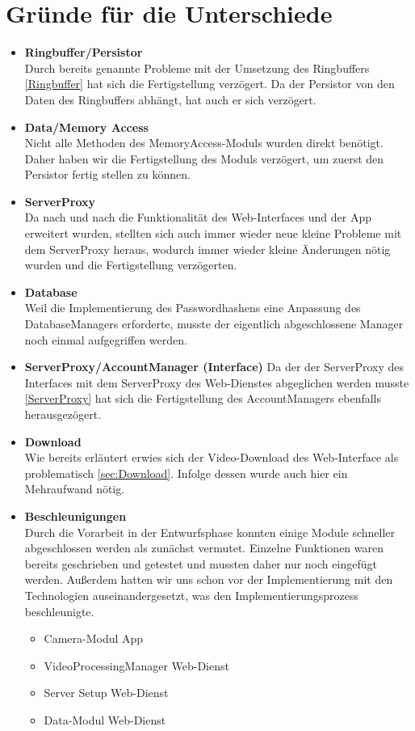 \section{Gründe für die Unterschiede} \label{sec:PlanDiff}
\begin{itemize}

\item \textbf{Ringbuffer/Persistor} \hfill \\
Durch bereits genannte Probleme mit der Umsetzung des Ringbuffers \eqref{Ringbuffer} hat sich die Fertigstellung verzögert. Da der Persistor von den Daten des Ringbuffers abhängt, hat auch er sich verzögert.

\item \textbf{Data/Memory Access} \hfill \\
Nicht alle Methoden des MemoryAccess-Moduls wurden direkt benötigt. Daher haben wir die Fertigstellung des Moduls verzögert, um zuerst den Persistor fertig stellen zu können.

\item \label{ServerProxy} \textbf{ServerProxy} \hfill \\
Da nach und nach die Funktionalität des Web-Interfaces und der App erweitert wurden, stellten sich auch immer wieder neue kleine Probleme mit dem ServerProxy heraus, wodurch immer wieder kleine Änderungen nötig wurden und die Fertigstellung verzögerten.

\item \textbf{Database} \hfill \\
Weil die Implementierung des Passwordhashens eine Anpassung des DatabaseManagers erforderte, musste der eigentlich abgeschlossene Manager noch einmal aufgegriffen werden.

\item \textbf{ServerProxy/AccountManager (Interface)}
Da der der ServerProxy des Interfaces mit dem ServerProxy des Web-Dienstes abgeglichen werden musste \eqref{ServerProxy} hat sich die Fertigstellung des AccountManagers ebenfalls herausgezögert.

\item \textbf{Download} \hfill \\
Wie bereits erläutert erwies sich der Video-Download des Web-Interface als problematisch \eqref{sec:Download}. Infolge dessen wurde auch hier ein Mehraufwand nötig.

\item \textbf{Beschleunigungen} \hfill \\
Durch die Vorarbeit in der Entwurfsphase konnten einige Module schneller abgeschlossen werden als zunächst vermutet. Einzelne Funktionen waren bereits geschrieben und getestet und mussten daher nur noch eingefügt werden. Außerdem hatten wir uns schon vor der Implementierung mit den Technologien auseinandergesetzt, was den Implementierungsprozess beschleunigte.
\begin{itemize}
\itemsep0pt
\item Camera-Modul App
\item VideoProcessingManager Web-Dienst
\item Server Setup Web-Dienst
\item Data-Modul Web-Dienst
\end{itemize}
\end{itemize}